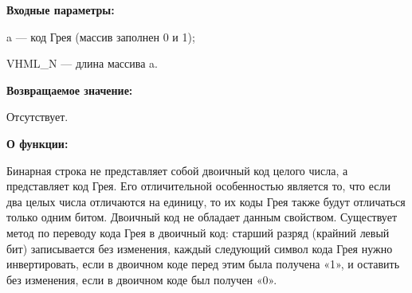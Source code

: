 \textbf{Входные параметры:}
 
 a --- код Грея (массив заполнен 0 и 1);
 
 VHML\_N --- длина массива a.
 
\textbf{Возвращаемое значение:}

 Отсутствует.
 
\textbf{О функции:}

Бинарная строка не представляет собой двоичный код целого числа, а представляет код Грея. Его отличительной особенностью является то, что если два целых числа отличаются на единицу, то их коды Грея также будут отличаться только одним битом. Двоичный код не обладает данным свойством.
Существует метод по переводу кода Грея в двоичный код: старший разряд (крайний левый бит) записывается без изменения, каждый следующий символ кода Грея нужно инвертировать, если в двоичном коде перед этим была получена «1», и оставить без изменения, если в двоичном коде был получен «0». 